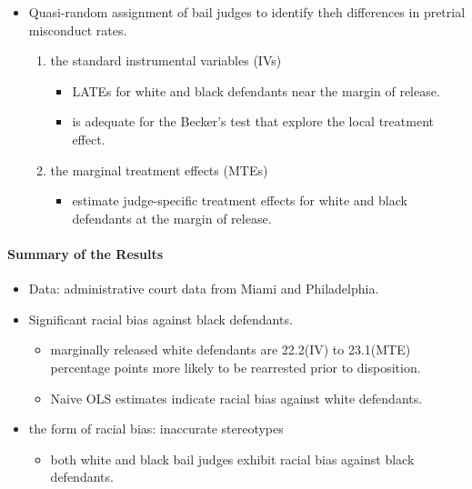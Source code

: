 \documentclass[../root]{subfiles}
\begin{document}
    \begin{itemize}
      \item Quasi-random assignment of bail judges to identify theh differences in pretrial misconduct rates.
      \begin{enumerate}
        \item the standard instrumental variables (IVs)
        \begin{itemize}
          \item LATEs for white and black defendants near the margin of release.
          \item is adequate for the Becker's test that explore the local treatment effect.
        \end{itemize}
        \item the marginal treatment effects (MTEs)
        \begin{itemize}
          \item estimate judge-specific treatment effects for white and black defendants at the margin of release.
        \end{itemize}
      \end{enumerate}
    \end{itemize}

    \paragraph{Summary of the Results}

    \begin{itemize}
      \item Data: administrative court data from Miami and Philadelphia.
      \item Significant racial bias against black defendants.
      \begin{itemize}
        \item marginally released white defendants are 22.2(IV) to 23.1(MTE) percentage points more likely to be rearrested prior to disposition.
        \item Naive OLS estimates indicate racial bias against white defendants.
      \end{itemize}
      \item the form of racial bias: inaccurate stereotypes
      \begin{itemize}
        \item both white and black bail judges exhibit racial bias against black defendants.
      \end{itemize}
    \end{itemize}
\end{document}
